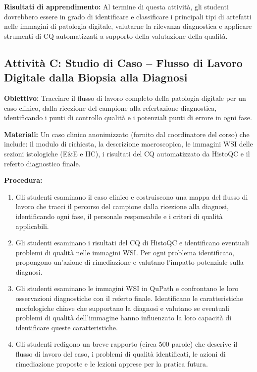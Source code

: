 \textbf{Risultati di apprendimento:} Al termine di questa attività, gli studenti dovrebbero
essere in grado di identificare e classificare i principali tipi di artefatti nelle immagini di
patologia digitale, valutarne la rilevanza diagnostica e applicare strumenti di CQ automatizzati
a supporto della valutazione della qualità.

\subsection{Attività C: Studio di Caso -- Flusso di Lavoro Digitale dalla Biopsia alla Diagnosi}

\textbf{Obiettivo:} Tracciare il flusso di lavoro completo della patologia digitale per un caso
clinico, dalla ricezione del campione alla refertazione diagnostica, identificando i punti di
controllo qualità e i potenziali punti di errore in ogni fase.

\textbf{Materiali:} Un caso clinico anonimizzato (fornito dal coordinatore del corso) che include:
il modulo di richiesta, la descrizione macroscopica, le immagini WSI delle sezioni istologiche
(E\&E e IIC), i risultati del CQ automatizzato da HistoQC e il referto diagnostico finale.

\textbf{Procedura:}
\begin{enumerate}
    \item Gli studenti esaminano il caso clinico e costruiscono una mappa del flusso di lavoro
    che tracci il percorso del campione dalla ricezione alla diagnosi, identificando ogni fase,
    il personale responsabile e i criteri di qualità applicabili.

    \item Gli studenti esaminano i risultati del CQ di HistoQC e identificano eventuali problemi
    di qualità nelle immagini WSI. Per ogni problema identificato, propongono un'azione di
    rimediazione e valutano l'impatto potenziale sulla diagnosi.

    \item Gli studenti esaminano le immagini WSI in QuPath e confrontano le loro osservazioni
    diagnostiche con il referto finale. Identificano le caratteristiche morfologiche chiave che
    supportano la diagnosi e valutano se eventuali problemi di qualità dell'immagine hanno
    influenzato la loro capacità di identificare queste caratteristiche.

    \item Gli studenti redigono un breve rapporto (circa 500 parole) che descrive il flusso di
    lavoro del caso, i problemi di qualità identificati, le azioni di rimediazione proposte e
    le lezioni apprese per la pratica futura.
\end{enumerate}

